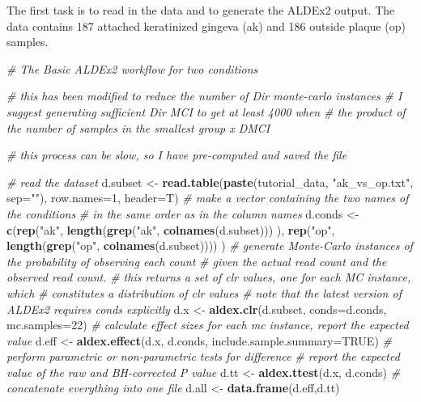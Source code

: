 \documentclass[onecolumn]{book}
\newenvironment{Shaded}{\begin{snugshade}}{\end{snugshade}}
\newcommand{\CommentTok}[1]{\textcolor[rgb]{0.56,0.35,0.01}{\textit{#1}}}
\newcommand{\DataTypeTok}[1]{\textcolor[rgb]{0.13,0.29,0.53}{#1}}
\newcommand{\DecValTok}[1]{\textcolor[rgb]{0.00,0.00,0.81}{#1}}
\newcommand{\KeywordTok}[1]{\textcolor[rgb]{0.13,0.29,0.53}{\textbf{#1}}}
\newcommand{\NormalTok}[1]{#1}
\newcommand{\OtherTok}[1]{\textcolor[rgb]{0.56,0.35,0.01}{#1}}
\newcommand{\StringTok}[1]{\textcolor[rgb]{0.31,0.60,0.02}{#1}}
\theoremstyle{definition}
\theoremstyle{definition}
\theoremstyle{definition}
\theoremstyle{remark}
\begin{document}
The first task is to read in the data and to generate the ALDEx2 output.
The data contains 187 attached keratinized gingeva (ak) and 186 outside
plaque (op) samples.

\begin{Shaded}
\begin{Highlighting}[]
\CommentTok{# The Basic ALDEx2 workflow for two conditions}

\CommentTok{# this has been modified to reduce the number of Dir monte-carlo instances}
\CommentTok{# I suggest generating sufficient Dir MCI to get at least 4000 when}
\CommentTok{# the product of the number of samples in the smallest group x DMCI}

\CommentTok{# this process can be slow, so I have pre-computed and saved the file}


\CommentTok{# read the dataset}
\NormalTok{d.subset <-}\StringTok{ }\KeywordTok{read.table}\NormalTok{(}\KeywordTok{paste}\NormalTok{(tutorial_data, }\StringTok{"ak_vs_op.txt"}\NormalTok{, }\DataTypeTok{sep=}\StringTok{""}\NormalTok{),}
    \DataTypeTok{row.names=}\DecValTok{1}\NormalTok{, }\DataTypeTok{header=}\NormalTok{T)}
\CommentTok{# make a vector containing the two names of the conditions}
\CommentTok{# in the same order as in the column names}
\NormalTok{d.conds <-}\StringTok{ }\KeywordTok{c}\NormalTok{(}\KeywordTok{rep}\NormalTok{(}\StringTok{"ak"}\NormalTok{, }\KeywordTok{length}\NormalTok{(}\KeywordTok{grep}\NormalTok{(}\StringTok{"ak"}\NormalTok{, }\KeywordTok{colnames}\NormalTok{(d.subset))) ),}
    \KeywordTok{rep}\NormalTok{(}\StringTok{"op"}\NormalTok{, }\KeywordTok{length}\NormalTok{(}\KeywordTok{grep}\NormalTok{(}\StringTok{"op"}\NormalTok{, }\KeywordTok{colnames}\NormalTok{(d.subset)))) )}
\CommentTok{# generate Monte-Carlo instances of the probability of observing each count}
\CommentTok{# given the actual read count and the observed read count.}
\CommentTok{# this returns a set of clr values, one for each MC instance, which}
\CommentTok{# constitutes a distribution of clr values}
\CommentTok{# note that the latest version of ALDEx2 requires conds explicitly}
\NormalTok{d.x <-}\StringTok{ }\KeywordTok{aldex.clr}\NormalTok{(d.subset, }\DataTypeTok{conds=}\NormalTok{d.conds, }\DataTypeTok{mc.samples=}\DecValTok{22}\NormalTok{)}
\CommentTok{# calculate effect sizes for each mc instance, report the expected value}
\NormalTok{d.eff <-}\StringTok{ }\KeywordTok{aldex.effect}\NormalTok{(d.x, d.conds, }\DataTypeTok{include.sample.summary=}\OtherTok{TRUE}\NormalTok{)}
\CommentTok{# perform parametric or non-parametric tests for difference}
\CommentTok{# report the expected value of the raw and BH-corrected P value}
\NormalTok{d.tt <-}\StringTok{ }\KeywordTok{aldex.ttest}\NormalTok{(d.x, d.conds)}
\CommentTok{# concatenate everything into one file}
\NormalTok{d.all <-}\StringTok{ }\KeywordTok{data.frame}\NormalTok{(d.eff,d.tt)}


\end{Highlighting}
\end{Shaded}
\end{document}
